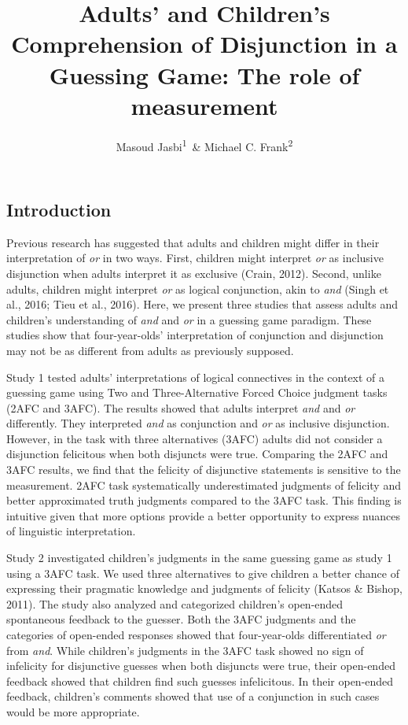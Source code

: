 \documentclass[floatsintext,man]{apa6}
\title{Adults' and Children's Comprehension of Disjunction in a Guessing Game:
The role of measurement}
\author{Masoud Jasbi\textsuperscript{1}~\& Michael C. Frank\textsuperscript{2}}
\affiliation{
    \vspace{0.5cm}
          \textsuperscript{1} Harvard University\\
          \textsuperscript{2} Stanford University  }
\theoremstyle{definition}
\theoremstyle{definition}
\theoremstyle{definition}
\theoremstyle{remark}
\begin{document}
\maketitle

\setcounter{secnumdepth}{0}



\subsection{Introduction}\label{introduction}

Previous research has suggested that adults and children might differ in
their interpretation of \emph{or} in two ways. First, children might
interpret \emph{or} as inclusive disjunction when adults interpret it as
exclusive (Crain, 2012). Second, unlike adults, children might interpret
\emph{or} as logical conjunction, akin to \emph{and} (Singh et al.,
2016; Tieu et al., 2016). Here, we present three studies that assess
adults and children's understanding of \emph{and} and \emph{or} in a
guessing game paradigm. These studies show that four-year-olds'
interpretation of conjunction and disjunction may not be as different
from adults as previously supposed.

Study 1 tested adults' interpretations of logical connectives in the
context of a guessing game using Two and Three-Alternative Forced Choice
judgment tasks (2AFC and 3AFC). The results showed that adults interpret
\emph{and} and \emph{or} differently. They interpreted \emph{and} as
conjunction and \emph{or} as inclusive disjunction. However, in the task
with three alternatives (3AFC) adults did not consider a disjunction
felicitous when both disjuncts were true. Comparing the 2AFC and 3AFC
results, we find that the felicity of disjunctive statements is
sensitive to the measurement. 2AFC task systematically underestimated
judgments of felicity and better approximated truth judgments compared
to the 3AFC task. This finding is intuitive given that more options
provide a better opportunity to express nuances of linguistic
interpretation.

Study 2 investigated children's judgments in the same guessing game as
study 1 using a 3AFC task. We used three alternatives to give children a
better chance of expressing their pragmatic knowledge and judgments of
felicity (Katsos \& Bishop, 2011). The study also analyzed and
categorized children's open-ended spontaneous feedback to the guesser.
Both the 3AFC judgments and the categories of open-ended responses
showed that four-year-olds differentiated \emph{or} from \emph{and}.
While children's judgments in the 3AFC task showed no sign of infelicity
for disjunctive guesses when both disjuncts were true, their open-ended
feedback showed that children find such guesses infelicitous. In their
open-ended feedback, children's comments showed that use of a
conjunction in such cases would be more appropriate.
\end{document}

